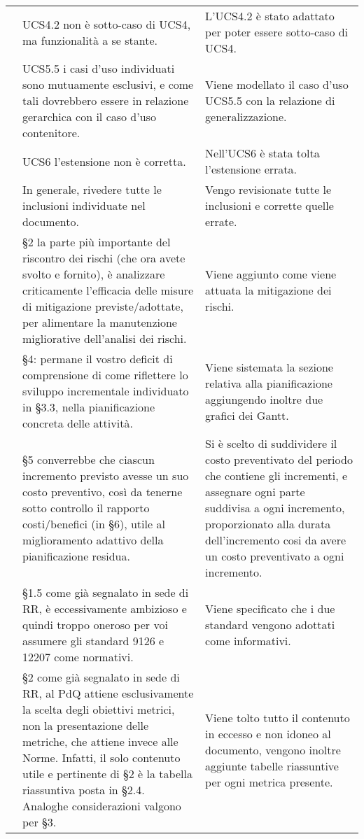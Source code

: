 {\begin{longtable}{ C{2cm} C{6cm} C{6cm}}
		\AdR & UCS4.2 non è sotto-caso di UCS4, ma funzionalità a se stante. & L'UCS4.2 è stato adattato per poter essere sotto-caso di UCS4.\\
		
		\AdR & UCS5.5 i casi d’uso individuati sono mutuamente esclusivi, e come tali dovrebbero essere in relazione gerarchica con il caso d’uso contenitore. & Viene modellato il caso d'uso UCS5.5 con la relazione di generalizzazione.\\
		
		\AdR & UCS6 l’estensione non è corretta. & Nell'UCS6 è stata tolta l'estensione errata.\\
		
		\AdR & In generale, rivedere tutte le inclusioni individuate nel documento.& Vengo revisionate tutte le inclusioni e corrette quelle errate.\\
		
		\PdP & §2 la parte più importante del riscontro dei rischi (che ora avete svolto e fornito), è analizzare criticamente l’efficacia delle misure di mitigazione previste/adottate, per alimentare la manutenzione migliorative dell’analisi dei rischi. & Viene aggiunto come viene attuata la mitigazione dei rischi. \\
		
		\PdP & §4: permane il vostro deficit di comprensione di come riflettere lo
		sviluppo incrementale individuato in §3.3, nella pianificazione concreta delle
		attività. & Viene sistemata la sezione relativa alla pianificazione aggiungendo inoltre due grafici dei Gantt.\\
		
		\PdP & §5 converrebbe che ciascun incremento previsto avesse un suo costo preventivo, così da tenerne sotto controllo il rapporto costi/benefici (in §6), utile al miglioramento adattivo della pianificazione residua. & Si è scelto di suddividere il costo preventivato del periodo che contiene gli incrementi, e assegnare ogni parte suddivisa a ogni incremento, proporzionato alla durata dell'incremento cosi da avere un costo preventivato a ogni incremento. \\
		
		\PdQ & §1.5 come già segnalato in sede di RR, è eccessivamente ambizioso e quindi troppo oneroso per voi assumere gli standard 9126 e 12207 come normativi. & Viene specificato che i due standard vengono adottati come informativi.\\
		
		\PdQ & §2 come già segnalato in sede di RR, al PdQ attiene esclusivamente la
		scelta degli obiettivi metrici, non la presentazione delle metriche, che attiene invece alle Norme. Infatti, il solo contenuto utile e pertinente di §2 è la tabella riassuntiva posta in §2.4. Analoghe considerazioni valgono per §3. & Viene tolto tutto il contenuto in eccesso e non idoneo al documento, vengono inoltre aggiunte tabelle riassuntive per ogni metrica presente.\\
		

\end{longtable}}
